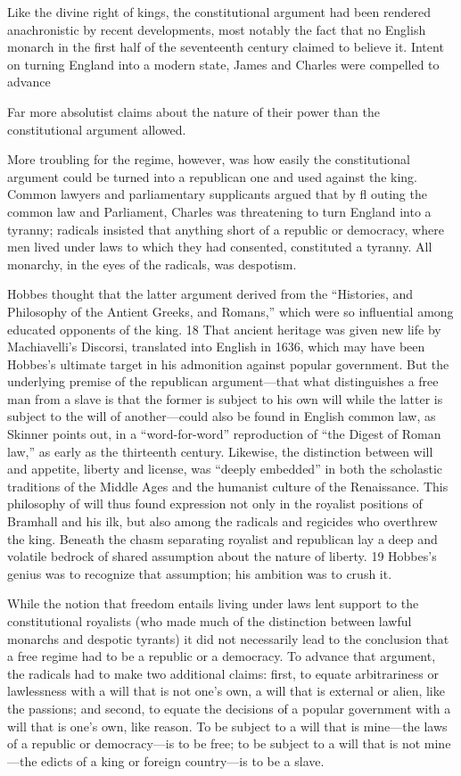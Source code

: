  \par 
Like the divine right of kings, the constitutional argument had been rendered anachronistic by recent developments, most notably the fact that no English monarch in the first half of the seventeenth century claimed to believe it. Intent on turning England into a modern state, James and Charles were compelled to advance
 \par 
Far more absolutist claims about the nature of their power than the constitutional argument allowed.
 \par 
More troubling for the regime, however, was how easily the constitutional argument could be turned into a republican one and used against the king. Common lawyers and parliamentary supplicants argued that by fl outing the common law and Parliament, Charles was threatening to turn England into a tyranny; radicals insisted that anything short of a republic or democracy, where men lived under laws to which they had consented, constituted a tyranny. All monarchy, in the eyes of the radicals, was despotism.
 \par 
Hobbes thought that the latter argument derived from the “Histories, and Philosophy of the Antient Greeks, and Romans,” which were so influential among educated opponents of the king. {\color{blue}18} That ancient heritage was given new life by Machiavelli’s Discorsi, translated into English in 1636, which may have been Hobbes’s ultimate target in his admonition against popular government. But the underlying premise of the republican argument—that what distinguishes a free man from a slave is that the former is subject to his own will while the latter is subject to the will of another—could also be found in English common law, as Skinner points out, in a “word-for-word” reproduction of “the Digest of Roman law,” as early as the thirteenth century. Likewise, the distinction between will and appetite, liberty and license, was “deeply embedded” in both the scholastic traditions of the Middle Ages and the humanist culture of the Renaissance. This philosophy of will thus found expression not only in the royalist positions of Bramhall and his ilk, but also among the radicals and regicides who overthrew the king. Beneath the chasm separating royalist and republican lay a deep and volatile bedrock of shared assumption about the nature of liberty. {\color{blue}19} Hobbes’s genius was to recognize that assumption; his ambition was to crush it.
 \par 
While the notion that freedom entails living under laws lent support to the constitutional royalists (who made much of the distinction between lawful monarchs and despotic tyrants) it did not necessarily lead to the conclusion that a free regime had to be a republic or a democracy. To advance that argument, the radicals had to make two additional claims: first, to equate arbitrariness or lawlessness with a will that is not one’s own, a will that is external or alien, like the passions; and second, to equate the decisions of a popular government with a will that is one’s own, like reason. To be subject to a will that is mine—the laws of a republic or democracy—is to be free; to be subject to a will that is not mine—the edicts of a king or foreign country—is to be a slave.
